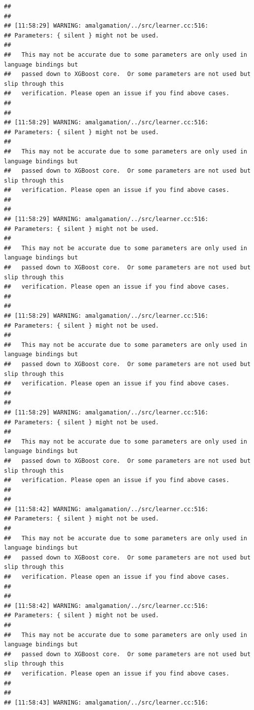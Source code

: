 \documentclass[AMS,STIX2COL]{WileyNJD-v2}\usepackage[]{graphicx}\usepackage[]{color}
\makeatletter
\newenvironment{kframe}{%
 \def\at@end@of@kframe{}%
 \ifinner\ifhmode%
  \def\at@end@of@kframe{\end{minipage}}%
  \begin{minipage}{\columnwidth}%
 \fi\fi%
 \def\FrameCommand##1{\hskip\@totalleftmargin \hskip-\fboxsep
 \colorbox{shadecolor}{##1}\hskip-\fboxsep
     \hskip-\linewidth \hskip-\@totalleftmargin \hskip\columnwidth}%
 \MakeFramed {\advance\hsize-\width
   \@totalleftmargin\z@ \linewidth\hsize
   \@setminipage}}%
 {\par\unskip\endMakeFramed%
 \at@end@of@kframe}
\newenvironment{knitrout}{}{} %
\makeatother
\begin{document}
\begin{knitrout}
\begin{kframe}
\begin{verbatim}
## 
## 
## [11:58:29] WARNING: amalgamation/../src/learner.cc:516: 
## Parameters: { silent } might not be used.
## 
##   This may not be accurate due to some parameters are only used in language bindings but
##   passed down to XGBoost core.  Or some parameters are not used but slip through this
##   verification. Please open an issue if you find above cases.
## 
## 
## [11:58:29] WARNING: amalgamation/../src/learner.cc:516: 
## Parameters: { silent } might not be used.
## 
##   This may not be accurate due to some parameters are only used in language bindings but
##   passed down to XGBoost core.  Or some parameters are not used but slip through this
##   verification. Please open an issue if you find above cases.
## 
## 
## [11:58:29] WARNING: amalgamation/../src/learner.cc:516: 
## Parameters: { silent } might not be used.
## 
##   This may not be accurate due to some parameters are only used in language bindings but
##   passed down to XGBoost core.  Or some parameters are not used but slip through this
##   verification. Please open an issue if you find above cases.
## 
## 
## [11:58:29] WARNING: amalgamation/../src/learner.cc:516: 
## Parameters: { silent } might not be used.
## 
##   This may not be accurate due to some parameters are only used in language bindings but
##   passed down to XGBoost core.  Or some parameters are not used but slip through this
##   verification. Please open an issue if you find above cases.
## 
## 
## [11:58:29] WARNING: amalgamation/../src/learner.cc:516: 
## Parameters: { silent } might not be used.
## 
##   This may not be accurate due to some parameters are only used in language bindings but
##   passed down to XGBoost core.  Or some parameters are not used but slip through this
##   verification. Please open an issue if you find above cases.
## 
## 
## [11:58:42] WARNING: amalgamation/../src/learner.cc:516: 
## Parameters: { silent } might not be used.
## 
##   This may not be accurate due to some parameters are only used in language bindings but
##   passed down to XGBoost core.  Or some parameters are not used but slip through this
##   verification. Please open an issue if you find above cases.
## 
## 
## [11:58:42] WARNING: amalgamation/../src/learner.cc:516: 
## Parameters: { silent } might not be used.
## 
##   This may not be accurate due to some parameters are only used in language bindings but
##   passed down to XGBoost core.  Or some parameters are not used but slip through this
##   verification. Please open an issue if you find above cases.
## 
## 
## [11:58:43] WARNING: amalgamation/../src/learner.cc:516: 

\end{verbatim}
\end{kframe}
\end{knitrout}
\end{document}
